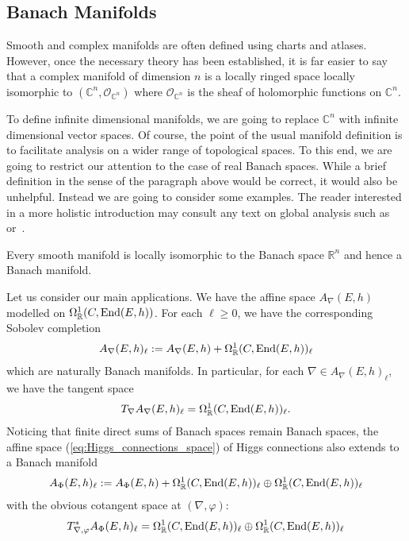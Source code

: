 \documentclass[12pt]{ociamthesis}  %
\begin{document}
\subsection{Banach Manifolds}

Smooth and complex manifolds are often defined using charts and
atlases. However, once the necessary theory has been established,
it is far easier to say that a complex manifold
of dimension $n$ is a locally ringed space locally isomorphic to
$(\mathbb{C}^n,\mathcal O_{\mathbb{C}^n})$ where
$\mathcal O_{\mathbb{C}^n}$ is the sheaf of holomorphic functions on
$\mathbb{C}^n$.

To define infinite dimensional manifolds, we are going to replace
$\mathbb{C}^n$ with infinite dimensional vector spaces. Of course,
the point of the usual manifold definition is to facilitate analysis
on a wider range of topological spaces. To this end, we are going to
restrict our attention to the case of real Banach spaces. While a brief
definition in the sense of the paragraph above would be correct,
it would also be unhelpful. Instead we are going to consider some
examples. The reader interested in a more holistic
introduction may consult any text on global analysis such
as~\cite[Chapter 7]{kahn1982} or~\cite{bc2009}.

\begin{example}
  Every smooth manifold is locally isomorphic to
  the Banach space $\mathbb R^n$ and hence a Banach manifold.
\end{example}

\begin{example}
  Let us consider our main applications. We have the affine space
  $A_\nabla(E,h)$ modelled on $\Omega^1_{\mathbb{R}}(C,\operatorname{End}(E,h))$.
  For each $\ell \geq 0$, we have the corresponding Sobolev completion
  \begin{align*}
    A_\nabla(E,h)_\ell := A_\nabla(E,h) + \Omega^1_{\mathbb{R}}(C,\operatorname{End}(E,h))_\ell
  \end{align*}
  which are naturally Banach manifolds.
  In particular, for each $\nabla\in A_\nabla(E,h)_\ell$, we have the
  tangent space
  \begin{align*}
    T_\nabla A_\nabla(E,h)_\ell
    = \Omega^1_{\mathbb{R}}(C,\operatorname{End}(E,h))_\ell.
  \end{align*}
  Noticing that finite direct sums of Banach spaces remain Banach spaces,
  the affine space (\ref{eq:Higgs_connections_space}) of Higgs connections also
  extends to a Banach manifold
  \begin{align*}
    A_\Phi(E,h)_\ell := A_\Phi(E,h) + \Omega^1_{\mathbb{R}}(C,\operatorname{End}(E,h))_\ell
    \oplus \Omega^1_{\mathbb{R}}(C,\operatorname{End}(E,h))_\ell
  \end{align*}
  with the obvious cotangent space at $(\nabla,\varphi)$:
  \begin{align*}
    T^*_{\nabla,\varphi} A_\Phi(E,h)_\ell
    = \Omega^1_{\mathbb{R}}(C,\operatorname{End}(E,h))_\ell
    \oplus \Omega^1_{\mathbb{R}}(C,\operatorname{End}(E,h))_\ell
  \end{align*}
\end{example}
\end{document}
